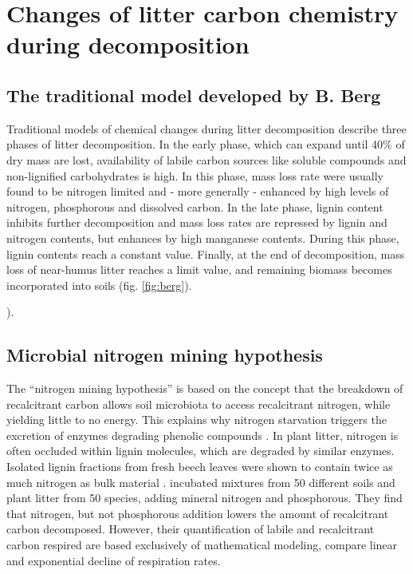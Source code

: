 \section{Changes of litter carbon chemistry during decomposition}

\subsection{The traditional model developed by B. Berg}

Traditional models of chemical changes during litter decomposition describe three phases of litter decomposition. In the early phase, which can expand until 40\% of dry mass are lost, availability of labile carbon sources like soluble compounds and non-lignified carbohydrates is high. In this phase, mass loss rate were usually found to be nitrogen limited and - more generally - enhanced by high levels of nitrogen, phosphorous and dissolved carbon. In the late phase, lignin content inhibits further decomposition and mass loss rates are repressed by lignin and nitrogen contents, but enhances by high manganese contents. During this phase, lignin contents reach a constant value. Finally, at the end of decomposition, mass loss of near-humus litter reaches a limit value, and remaining biomass becomes incorporated into soils (fig. \ref{fig:berg}). 

\cite{Berg2008}).

\subsection{Microbial nitrogen mining hypothesis}

The “nitrogen mining hypothesis” is based on the concept that the breakdown of recalcitrant carbon allows soil microbiota to access recalcitrant nitrogen, while yielding little to no energy. This explains why nitrogen starvation triggers the excretion of enzymes degrading phenolic compounds \citep{Craine2007, Moorhead2006}. In plant litter, nitrogen is often occluded within lignin molecules, which are degraded by similar enzymes. Isolated lignin fractions from fresh beech leaves were shown to contain twice as much nitrogen as bulk material \citep{Dyckmans2002}.
\cite{Craine2007} incubated mixtures from 50 different soils and plant litter from 50 species, adding mineral nitrogen and phosphorous. They find that nitrogen, but not phosphorous addition lowers the amount of recalcitrant carbon decomposed. However, their quantification of labile and recalcitrant carbon respired are based exclusively of mathematical modeling, compare linear and exponential decline of respiration rates.

